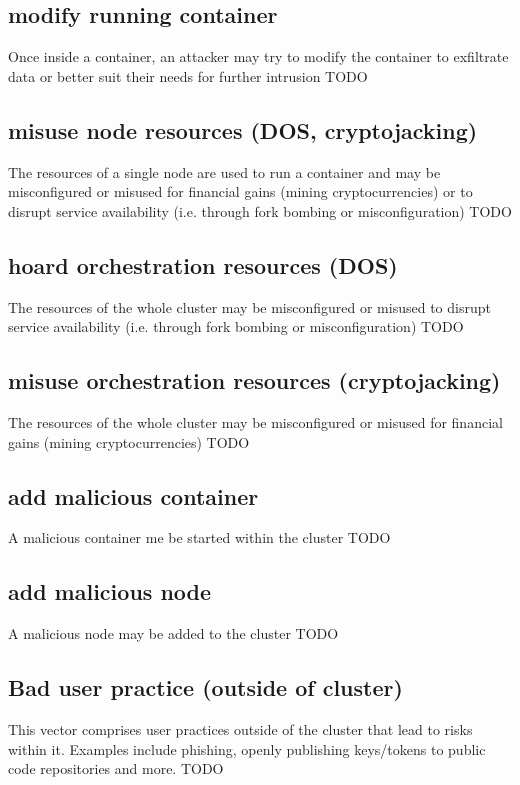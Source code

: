 \subsection{modify running container}
Once inside a container, an attacker may try to modify the container to exfiltrate data or better suit their needs for further intrusion
TODO

\subsection{misuse node resources (DOS, cryptojacking)}
The resources of a single node are used to run a container and may be misconfigured or misused for financial gains (mining cryptocurrencies) or to disrupt service availability (i.e. through fork bombing or misconfiguration)
TODO

\subsection{hoard orchestration resources (DOS)}
The resources of the whole cluster may be misconfigured or misused to disrupt service availability (i.e. through fork bombing or misconfiguration)
TODO

\subsection{misuse orchestration resources (cryptojacking)}
The resources of the whole cluster may be misconfigured or misused for financial gains (mining cryptocurrencies)
TODO

\subsection{add malicious container}
A malicious container me be started within the cluster
TODO

\subsection{add malicious node}
A malicious node may be added to the cluster
TODO

\subsection{Bad user practice (outside of cluster)}
This vector comprises user practices outside of the cluster that lead to risks within it. Examples include phishing, openly publishing keys/tokens to public code repositories and more.
TODO

